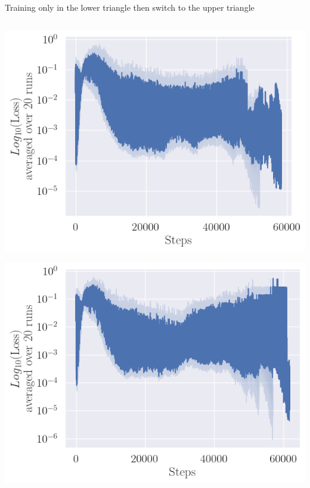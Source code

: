 \documentclass[bigger]{beamer}
\begin{document}
\begin{frame}[label={sec:org5306e95}]{Training only in the lower triangle then switch to the upper triangle}
\begin{columns}
\begin{column}{0.5\columnwidth}
\begin{center}
\includegraphics[height=0.4\textheight]{img/loss_upper-then-lower1.png}
\end{center}
\begin{center}
\includegraphics[height=0.4\textheight]{img/loss_upper-then-lower2.png}
\end{center}
\end{column}
\end{columns}
\end{frame}
\end{document}
